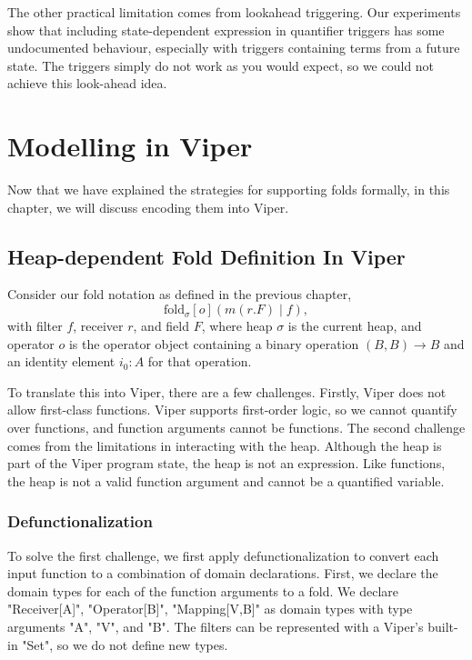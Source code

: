 \documentclass[msc,oneside]{ubcthesis}
\theoremstyle{definition}
\begin{document}
The other practical limitation comes from lookahead triggering. Our experiments show that including state-dependent expression in quantifier triggers has some undocumented behaviour, especially with triggers containing terms from a future state. The triggers simply do not work as you would expect, so we could not achieve this look-ahead idea.

\chapter{Modelling in Viper}
Now that we have explained the strategies for supporting folds formally, in this chapter, we will discuss encoding them into Viper.

\section{Heap-dependent Fold Definition In Viper}
Consider our fold notation as defined in the previous chapter, 
$$\textrm{fold}_{\sigma}[o]( m(r.F) \mid f),$$
with filter $f$, receiver $r$, and field $F$, where heap $\sigma$ is the current heap, and operator $o$ is the operator object containing a binary operation $(B, B) \rightarrow B$ and an identity element $i_0 : A$ for that operation.

To translate this into Viper, there are a few challenges. Firstly, Viper does not allow first-class functions. Viper supports first-order logic, so we cannot quantify over functions, and function arguments cannot be functions. The second challenge comes from the limitations in interacting with the heap. Although the heap is part of the Viper program state, the heap is not an expression. Like functions, the heap is not a valid function argument and cannot be a quantified variable. 

\subsection{Defunctionalization}
To solve the first challenge, we first apply defunctionalization to convert each input function to a combination of domain declarations. First, we declare the domain types for each of the function arguments to a fold. We declare "Receiver[A]", "Operator[B]", "Mapping[V,B]" as domain types with type arguments "A", "V", and "B". The filters can be represented with a Viper's built-in "Set", so we do not define new types.
\end{document}
